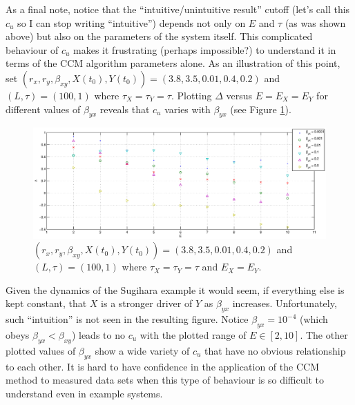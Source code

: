 \documentclass[a4paper,11pt]{article}
\begin{document}
As a final note, notice that the ``intuitive/unintuitive result'' cutoff (let's call this $c_u$ so I can stop writing ``intuitive'') depends not only on $E$ and $\tau$ (as was shown above) but also on the parameters of the system itself.  This complicated behaviour of $c_u$ makes it frustrating (perhaps impossible?) to understand it in terms of the CCM algorithm parameters alone.  As an illustration of this point, set $\left(r_x,r_y,\beta_{xy},X(t_0),Y(t_0)\right) = \left(3.8,3.5,0.01,0.4,0.2\right)$ and $\left(L,\tau\right) = \left(100,1\right)$ where $\tau_X=\tau_Y=\tau$.  Plotting $\Delta$ versus $E=E_X=E_Y$ for different values of $\beta_{yx}$ reveals that $c_u$ varies with $\beta_{yx}$ (see Figure \ref{fig:SugExvEdimvByx}).
\begin{figure}[h!t]
\centering
\label{fig:SugExvEdimvByx}
\includegraphics[scale=0.55]{SugExvEdimvByx.eps}
\caption{$\left(r_x,r_y,\beta_{xy},X(t_0),Y(t_0)\right) = \left(3.8,3.5,0.01,0.4,0.2\right)$ and $\left(L,\tau\right) = \left(100,1\right)$ where $\tau_X=\tau_Y=\tau$ and $E_X=E_Y$.}
\end{figure}
Given the dynamics of the Sugihara example it would seem, if everything else is kept constant, that $X$ is a stronger driver of $Y$ as $\beta_{yx}$ increases.  Unfortunately, such ``intuition'' is not seen in the resulting figure.  Notice $\beta_{yx} = 10^{-4}$ (which obeys $\beta_{yx} < \beta_{xy}$) leads to no $c_u$ with the plotted range of $E\in[2,10]$.  The other plotted values of $\beta_{yx}$ show a wide variety of $c_u$ that have no obvious relationship to each other.  It is hard to have confidence in the application of the CCM method to measured data sets when this type of behaviour is so difficult to understand even in example systems.
\end{document}
